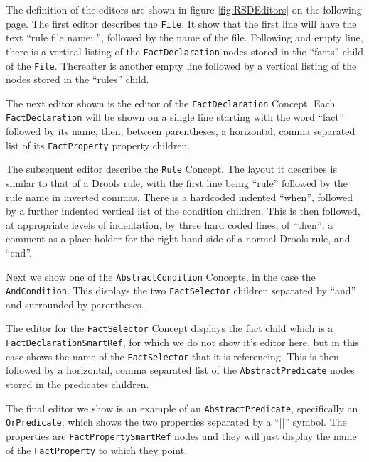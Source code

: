 The definition of the editors are shown in figure \ref{fig:RSDEditors} on the following page.
The first editor describes the \texttt{File}. 
It show that the first line will have the text ``rule file name: '', followed by the name of the file.
Following and empty line, there is a vertical listing of the \texttt{FactDeclaration} nodes stored in the ``facts'' child of the \texttt{File}.
Thereafter is another empty line followed by a vertical listing of the  nodes stored in the ``rules'' child.

The next editor shown is the editor of the \texttt{FactDeclaration} Concept.
Each \texttt{FactDeclaration} will be shown on a single line starting with the word ``fact'' followed by its name, then, between parentheses, a horizontal, comma separated list of its \texttt{FactProperty} property children.

The subsequent editor describe the \texttt{Rule} Concept. 
The layout it describes is similar to that of a Drools rule, with the first line being ``rule'' followed by the rule name in inverted commas.
There is a hardcoded indented ``when'', followed by a further indented vertical list of the condition children.
This is then followed, at appropriate levels of indentation, by three hard coded lines, of ``then'', a comment as a place holder for the right hand side of a normal Drools rule, and ``end''.

Next we show one of the \texttt{AbstractCondition} Concepts, in the case the \texttt{AndCondition}.
This displays the two \texttt{FactSelector} children separated by ``and'' and surrounded by parentheses.

The editor for the \texttt{FactSelector} Concept displays the fact child which is a \texttt{FactDeclarationSmartRef}, for which we do not show it's editor here, but in this case shows the name of the \texttt{FactSelector} that it is referencing.
This is then followed by a horizontal, comma separated list of the \texttt{AbstractPredicate} nodes stored in the predicates children.

The final editor we show is an example of an \texttt{AbstractPredicate}, specifically an \texttt{OrPredicate}, which shows the two properties separated by a ``||'' symbol.
The properties are \texttt{FactPropertySmartRef} nodes and they will just display the name of the \texttt{FactProperty} to which they point.

